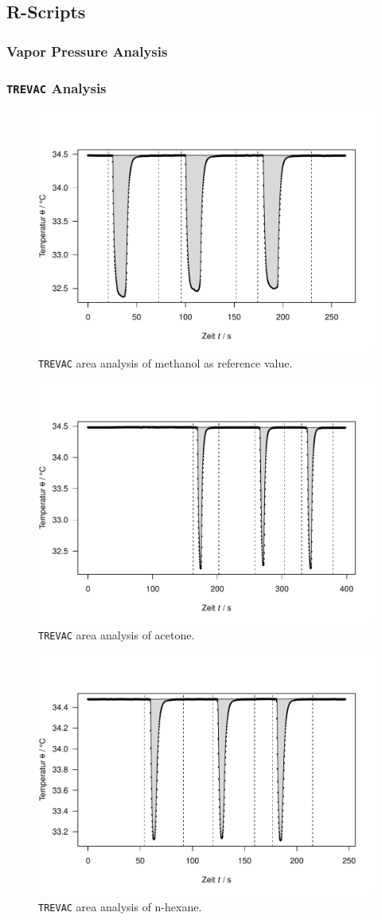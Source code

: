
\subsection{R-Scripts} \label{r_scripts}

\subsubsection{Vapor Pressure Analysis}

\newpage
\subsubsection{\texttt{TREVAC} Analysis}


\newpage

\begin{figure}[H]
    \centering
    \includegraphics[width=.5\textwidth]{figures/methanol.pdf}
    \caption{\texttt{TREVAC} area analysis of methanol as reference value.}
    \label{fig:sketch_rho}
\end{figure}

\begin{figure}[H]
    \centering
    \includegraphics[width=.5\textwidth]{figures/acetone.pdf}
    \caption{\texttt{TREVAC} area analysis of acetone.}
    \label{fig:sketch_rho}
\end{figure}

\begin{figure}[H]
    \centering
    \includegraphics[width=.5\textwidth]{figures/n-hexane.pdf}
    \caption{\texttt{TREVAC} area analysis of n-hexane.}
    \label{fig:sketch_rho}
\end{figure}



